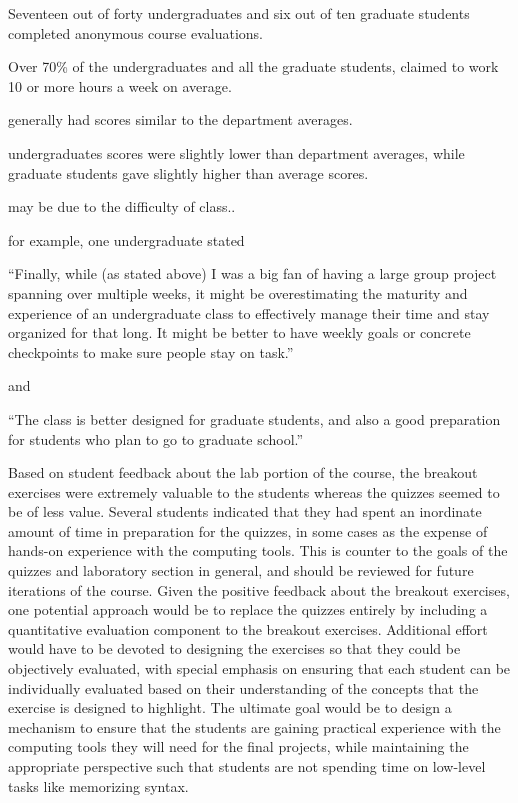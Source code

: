 Seventeen out of forty undergraduates and
six out of ten graduate students completed anonymous course evaluations.

Over 70\% of the undergraduates and all the graduate students, claimed to work
10 or more hours a week on average.

generally had scores similar to the department averages.

undergraduates scores were slightly lower than department averages,
while graduate students gave slightly higher than average scores.

may be due to the difficulty of class..

for example, one undergraduate stated

``Finally, while (as stated above) I was a big fan of having a large group
project spanning over multiple weeks, it might be overestimating the maturity
and experience of an undergraduate class to effectively manage their time and
stay organized for that long. It might be better to have weekly goals or
concrete checkpoints to make sure people stay on task.''

and

``The class is better designed for graduate students, and also a good
preparation for students who plan to go to graduate school.''

Based on student feedback about the lab portion of the course, the breakout
exercises were extremely valuable to the students whereas the quizzes seemed
to be of less value.
Several students indicated that they had spent an inordinate amount of time in
preparation for the quizzes, in some cases as the expense of hands-on
experience with the computing tools.
This is counter to the goals of the quizzes and laboratory section in general,
and should be reviewed for future iterations of the course.
Given the positive feedback about the breakout exercises, one potential 
approach would be to replace the quizzes entirely by including a quantitative
evaluation component to the breakout exercises.
Additional effort would have to be devoted to designing the exercises so that
they could be objectively evaluated, with special emphasis on ensuring that
each student can be individually evaluated based on their understanding of the
concepts that the exercise is designed to highlight.
The ultimate goal would be to design a mechanism to ensure that the students
are gaining practical experience with the computing tools they will need for 
the final projects, while maintaining the appropriate perspective such that
students are not spending time on low-level tasks like memorizing syntax.



